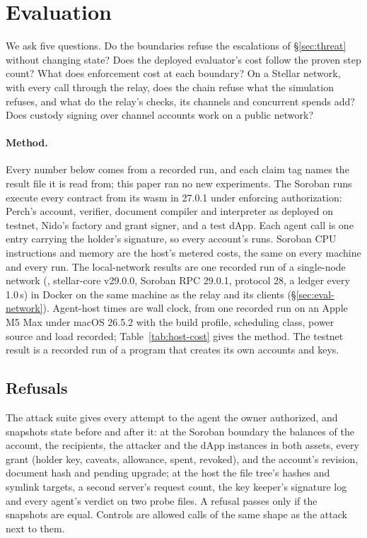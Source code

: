\section{Evaluation}\label{sec:eval}

We ask five questions. Do the boundaries refuse the escalations of
\S\ref{sec:threat} without changing state? Does the deployed evaluator's cost
follow the proven step count? What does enforcement cost at each boundary?
On a Stellar network, with every call through the relay, does the chain
refuse what the simulation refuses, and what do the relay's checks, its
channels and concurrent spends add? Does custody signing over channel
accounts work on a public network?

\paragraph{Method.} Every number below comes from a recorded run, and each
claim tag names the result file it is read from; this paper ran no new
experiments. The Soroban runs execute every contract from its wasm in
 27.0.1 under enforcing authorization: Perch's account,
 verifier, document compiler and interpreter as deployed on
testnet, Nido's factory and grant signer, and a test dApp. Each agent call is
one  entry carrying the holder's signature, so every
account's  runs. Soroban CPU instructions and memory are
the host's metered costs, the same on every machine and every run. The
local-network results are one recorded run of a single-node network
(, stellar-core v29.0.0, Soroban RPC 29.0.1,
protocol 28, a ledger every 1.0\,s) in Docker on the same machine as the
relay and its clients (\S\ref{sec:eval-network}).
Agent-host times are wall clock, from one recorded run on an Apple M5 Max
under macOS 26.5.2 with the build profile, scheduling class, power source and
load recorded; Table~\ref{tab:host-cost} gives the method. The testnet result
is a recorded run of a program that creates its own accounts and keys.

\subsection{Refusals}

The attack suite gives every attempt to the agent the owner authorized, and
snapshots state before and after it: at the Soroban boundary the balances of
the account, the recipients, the attacker and the dApp instances in both
assets, every grant (holder key, caveats, allowance, spent, revoked), and the
account's revision, document hash and pending upgrade; at the host the file
tree's hashes and symlink targets, a second server's request count, the key
keeper's signature log and every agent's verdict on two probe files. A refusal
passes only if the snapshots are equal. Controls are allowed calls of the same
shape as the attack next to them.

